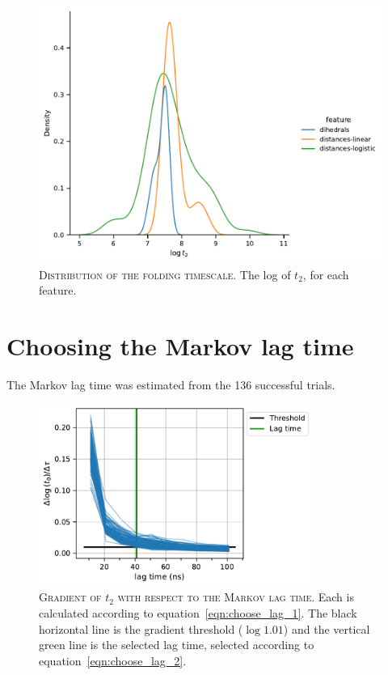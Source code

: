 \documentclass{article}
\begin{document}
\begin{figure}
    \centering
    \includegraphics{figures/timescale_dist_summary.pdf}
    \caption{\textsc{Distribution of the folding timescale}. The log of $t_2$, for each feature. }
    \label{fig:ts_distribution}
\end{figure}

\section{Choosing the Markov lag time}

The Markov lag time was estimated from the \num{136} successful trials.  

\begin{figure}[h]
    \centering
    \includegraphics[width=0.8\textwidth]{figures/BBA_timescale_gradient.pdf}
    \caption{\textsc{Gradient of $t_{2}$ with respect to the Markov lag time.} Each is calculated according to equation~\ref{eqn:choose_lag_1}.  The black horizontal line is the gradient threshold ($\log{1.01}$) and the vertical green line is the selected lag time, selected according to equation~\ref{eqn:choose_lag_2}. }
    \label{fig:choose_lag}
\end{figure}
\end{document}
